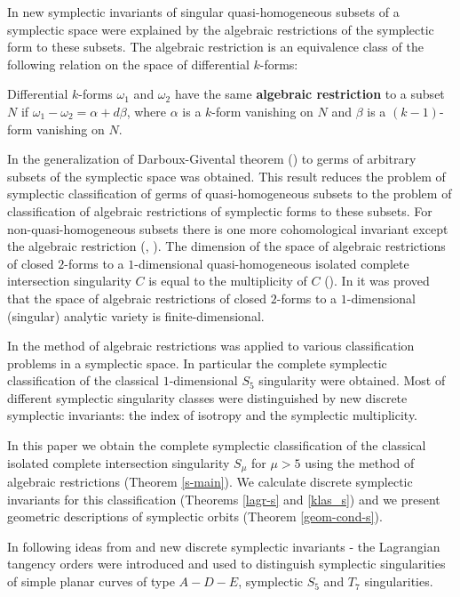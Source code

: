 \documentclass{amsart}
\theoremstyle{definition}
\numberwithin{equation}{section}
\begin{document}
In \cite{DJZ2} new symplectic invariants of singular
quasi-homogeneous  subsets of a symplectic space were explained by
the algebraic restrictions of the symplectic form to these
subsets. The algebraic restriction is an equivalence class of the
following relation on the space of differential $k$-forms:

Differential $k$-forms $\omega_1$ and $\omega_2$ have the same
{\bf algebraic restriction} to a subset $N$ if
$\omega_1-\omega_2=\alpha+d\beta$, where $\alpha$ is a $k$-form
vanishing on $N$ and $\beta$ is a $(k-1)$-form vanishing on $N$.

In \cite{DJZ2} the generalization of Darboux-Givental theorem (\cite{ArGi})
to germs of arbitrary subsets of the symplectic space was obtained. This result reduces
the problem of symplectic classification of germs of quasi-homo\-ge\-neous subsets to
the problem of classification of algebraic restrictions of symplectic
forms to these subsets. For non-quasi-homogeneous subsets there is one more cohomological invariant except the algebraic restriction (\cite{DJZ2},
\cite{DJZ1}). The dimension of the space of algebraic restrictions of closed $2$-forms to a $1$-dimensional quasi-homogeneous isolated complete
intersection singularity $C$ is equal to the multiplicity of $C$ (\cite{DJZ2}).
In \cite{D} it was proved that the space of algebraic restrictions
of closed
$2$-forms to a $1$-dimensional (singular) analytic variety is finite-dimensional.

In \cite{DJZ2} the method of algebraic restrictions was applied to
various classification problems in a symplectic space. In
particular the complete symplectic classification of the classical
$1$-dimensional $S_5$ singularity were obtained. Most of different
symplectic singularity classes were distinguished by new discrete
symplectic invariants: the index of isotropy and the symplectic
multiplicity.

In this paper we obtain the complete symplectic classification of
the classical isolated complete intersection singularity $S_{\mu}$
for $\mu>5$ using the method of algebraic restrictions (Theorem
\ref{s-main}). We calculate discrete symplectic invariants for
this classification (Theorems \ref{lagr-s} and \ref{klas_s}) and
we present geometric descriptions of symplectic orbits (Theorem
\ref{geom-cond-s}).

In \cite{DT} following ideas from \cite{Ar1} and \cite{D}  new
discrete symplectic invariants - the Lagrangian tangency orders
were introduced and used to distinguish symplectic
singularities of simple planar curves of type $A-D-E$, symplectic
$S_5$ and $T_7$ singularities.
\end{document}
